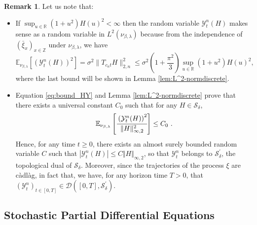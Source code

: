 \documentclass[a4paper, reqno, 12pt]{amsart}
\theoremstyle{plain}
\theoremstyle{definition}
\newtheorem{remark}[definition]{Remark}
\newcommand{\R}{\mathbb{R}}
\begin{document}
\begin{remark} \label{rem:fluctuationL2bound} 
Let us note that:
\begin{itemize}
\item[1.] If $\sup_{u\in\R}(1+u^2)H(u)^2 <\infty$ then the random variable $\mathcal{Y}^n_t(H)$ makes sense as a random variable in $ L^2 (\nu_{\beta, \lambda})$ because from the independence of $(\bar{\xi}_x)_{x \in \mathbb Z}$ under $\nu_{\beta, \lambda}$, we have 
\begin{equation}
\label{eq:bound_HY}
    {\mathbb E}_{\nu_{\beta, \lambda}} \left[ \left( \mathcal{Y}^n_t(H)\right)^2\right] = \sigma^2 \|T_{c_nt} H\|_{2,n}^2 \leq \sigma^2\left(1+ \frac{\pi^2}{3}\right) \sup_{u\in\R}(1+u^2)H(u)^2,
\end{equation}
where the last bound will be shown in Lemma \ref{lem:L^2-normdiscrete}. 
\item[2.] Equation \eqref{eq:bound_HY} and Lemma \ref{lem:L^2-normdiscrete} prove that there exists a universal constant $C_0$ such that for any $H\in {\mathcal S}_\delta$, 
\begin{equation*}
   {\mathbb E}_{\nu_{\beta, \lambda}} \left[ \cfrac{\left( \mathcal{Y}^n_t(H)\right)^2}{\Vert H \Vert_{\infty, 2}^2}\right] \le C_0 \ . 
\end{equation*}
Hence, for any time $t\ge 0$, there exists an almost surely bounded random variable $C$ such that $\left\vert \mathcal{Y}^n_t(H)\right\vert \le C \Vert H \Vert_{\infty, 2}$, so that $\mathcal Y_t^n$ belongs to $\mathcal S^\prime_\delta$, the topological dual of $\mathcal S_\delta$. Moreover, since  the trajectories of the process $\xi$ are c\`adl\`ag, in fact that, we have, for any horizon time $T>0$, that   $(\mathcal Y_t^n)_{t \in [0,T]} \in \mathcal D ([0,T], {\mathcal S}_\delta^\prime)$. 
\end{itemize}
\end{remark}




\subsection{Stochastic Partial Differential Equations}\label{sec:spde}
\end{document}
